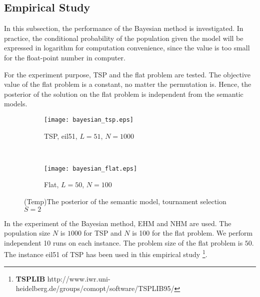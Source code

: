 \subsection{Empirical Study}
In this subsection, the performance of the Bayesian method is investigated. In practice, the conditional probability of the population given the model will be expressed in logarithm for computation convenience, since the value is too small for the float-point number in computer. 

For the experiment purpose,  TSP and the flat problem are tested. The objective value of the flat problem is a constant, no matter the permutation is. Hence, the posterior of the solution on the flat problem is independent from the semantic models. 

\begin{figure}[t]     
    \begin{subfigure}{1.0\textwidth}
        \texttt{[image: bayesian\_tsp.eps]}
        \caption{TSP, eil51, $L=51$, $N=1000$}
    \end{subfigure}\\

    \begin{subfigure}{1.0\textwidth}
        \texttt{[image: bayesian\_flat.eps]}
        \caption{Flat, $L=50$, $N=100$}
    \end{subfigure}
    \caption{(Temp)The posterior of the semantic model, tournament selection $S=2$ }
    \label{fig:bayesian_quality}
\end{figure}

In the experiment of the Bayesian method, EHM and NHM are used. The population size $N$ is $1000$ for TSP and $N$ is 100 for the flat problem. We perform independent 10 runs on each instance. The problem size of the flat problem is $50$. The instance eil51 of TSP has been used in this empirical study \footnote{\textbf{TSPLIB} http://www.iwr.uni-heidelberg.de/groups/comopt/software/TSPLIB95/}.%
 

